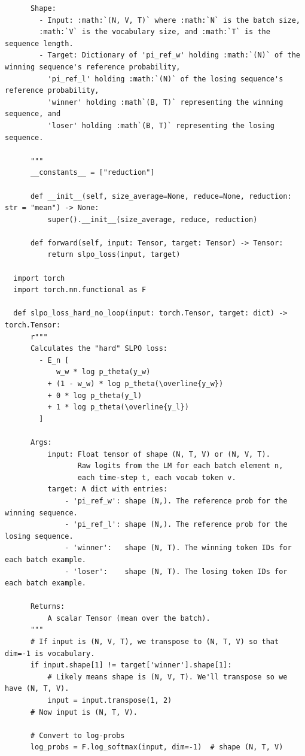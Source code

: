 \documentclass[twoside,11pt]{article}
\begin{document}
\begin{verbatim}
      Shape:
        - Input: :math:`(N, V, T)` where :math:`N` is the batch size, 
        :math:`V` is the vocabulary size, and :math:`T` is the sequence length.
        - Target: Dictionary of 'pi_ref_w' holding :math:`(N)` of the winning sequence's reference probability,
          'pi_ref_l' holding :math:`(N)` of the losing sequence's reference probability,
          'winner' holding :math`(B, T)` representing the winning sequence, and
          'loser' holding :math`(B, T)` representing the losing sequence. 
  
      """
      __constants__ = ["reduction"]
  
      def __init__(self, size_average=None, reduce=None, reduction: str = "mean") -> None:
          super().__init__(size_average, reduce, reduction)
  
      def forward(self, input: Tensor, target: Tensor) -> Tensor:
          return slpo_loss(input, target)
      
  import torch
  import torch.nn.functional as F
  
  def slpo_loss_hard_no_loop(input: torch.Tensor, target: dict) -> torch.Tensor:
      r"""
      Calculates the "hard" SLPO loss:
        - E_n [
            w_w * log p_theta(y_w) 
          + (1 - w_w) * log p_theta(\overline{y_w})
          + 0 * log p_theta(y_l)
          + 1 * log p_theta(\overline{y_l})
        ]
  
      Args:
          input: Float tensor of shape (N, T, V) or (N, V, T).
                 Raw logits from the LM for each batch element n,
                 each time-step t, each vocab token v.
          target: A dict with entries:
              - 'pi_ref_w': shape (N,). The reference prob for the winning sequence.
              - 'pi_ref_l': shape (N,). The reference prob for the losing sequence.
              - 'winner':   shape (N, T). The winning token IDs for each batch example.
              - 'loser':    shape (N, T). The losing token IDs for each batch example.
  
      Returns:
          A scalar Tensor (mean over the batch).
      """
      # If input is (N, V, T), we transpose to (N, T, V) so that dim=-1 is vocabulary.
      if input.shape[1] != target['winner'].shape[1]:
          # Likely means shape is (N, V, T). We'll transpose so we have (N, T, V).
          input = input.transpose(1, 2)
      # Now input is (N, T, V).
  
      # Convert to log-probs
      log_probs = F.log_softmax(input, dim=-1)  # shape (N, T, V)
  

\end{verbatim}
\end{document}
